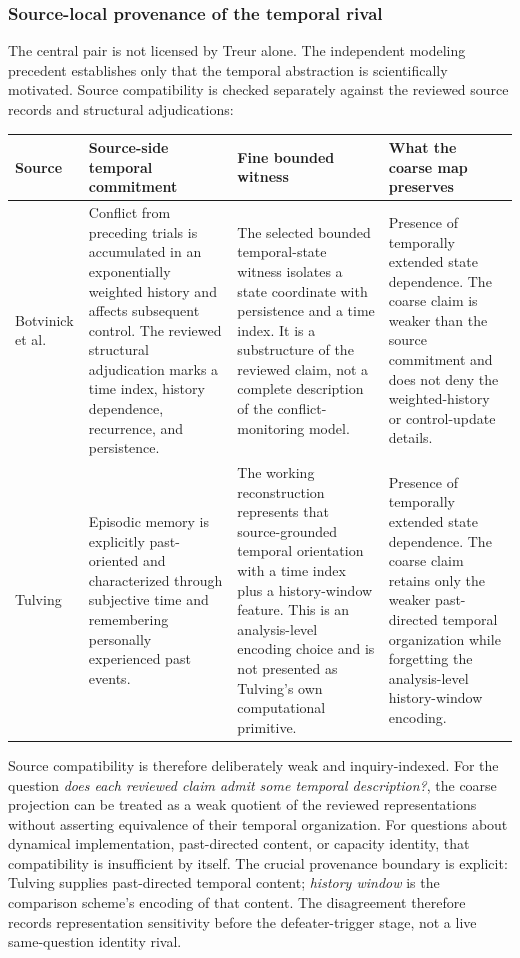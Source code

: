 \documentclass[11pt]{article}
\begin{document}
\subsubsection*{Source-local provenance of the temporal rival}
The central pair is not licensed by Treur alone. The independent modeling precedent establishes only that the temporal abstraction is scientifically motivated. Source compatibility is checked separately against the reviewed source records and structural adjudications:

\begingroup
\small
\noindent\begin{tabularx}{\textwidth}{>{\raggedright\arraybackslash}p{} >{\raggedright\arraybackslash}p{} >{\raggedright\arraybackslash}p{} X}
\toprule
Source & Source-side temporal commitment & Fine bounded witness & What the coarse map preserves \\
\midrule
Botvinick et al. & Conflict from preceding trials is accumulated in an exponentially weighted history and affects subsequent control. The reviewed structural adjudication marks a time index, history dependence, recurrence, and persistence. & The selected bounded temporal-state witness isolates a state coordinate with persistence and a time index. It is a substructure of the reviewed claim, not a complete description of the conflict-monitoring model. & Presence of temporally extended state dependence. The coarse claim is weaker than the source commitment and does not deny the weighted-history or control-update details. \\
Tulving & Episodic memory is explicitly past-oriented and characterized through subjective time and remembering personally experienced past events. & The working reconstruction represents that source-grounded temporal orientation with a time index plus a history-window feature. This is an analysis-level encoding choice and is not presented as Tulving's own computational primitive. & Presence of temporally extended state dependence. The coarse claim retains only the weaker past-directed temporal organization while forgetting the analysis-level history-window encoding. \\
\bottomrule
\end{tabularx}
\endgroup

Source compatibility is therefore deliberately weak and inquiry-indexed. For the question \emph{does each reviewed claim admit some temporal description?}, the coarse projection can be treated as a weak quotient of the reviewed representations without asserting equivalence of their temporal organization. For questions about dynamical implementation, past-directed content, or capacity identity, that compatibility is insufficient by itself. The crucial provenance boundary is explicit: Tulving supplies past-directed temporal content; \emph{history window} is the comparison scheme's encoding of that content. The disagreement therefore records representation sensitivity before the defeater-trigger stage, not a live same-question identity rival.
\end{document}

